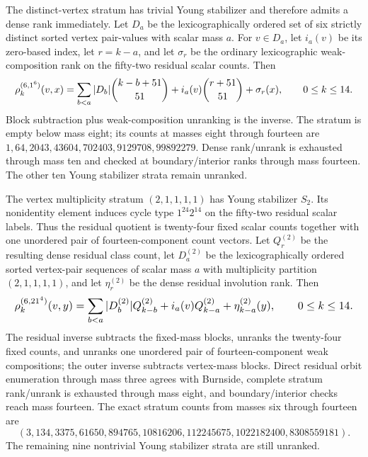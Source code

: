 \documentclass{article}
\newcommand{\fitmath}[1]{\resizebox{0.99\linewidth}{!}{$\displaystyle #1$}}
\begin{document}
The distinct-vertex stratum has trivial Young stabilizer and therefore admits a
dense rank immediately. Let $D_a$ be the lexicographically ordered set of six
strictly distinct sorted vertex pair-values with scalar mass $a$. For
$v\in D_a$, let $i_a(v)$ be its zero-based index, let $r=k-a$, and let
$\sigma_r$ be the ordinary lexicographic weak-composition rank on the fifty-two
residual scalar counts. Then
\begin{equation}
  \fitmath{%
    \rho^{(6,1^6)}_k(v,x)
      =\sum_{b<a}|D_b|\binom{k-b+51}{51}
       +i_a(v)\binom{r+51}{51}+\sigma_r(x),
    \qquad 0\leq k\leq14.
  }
  \label{eq:optimization-crazy-sextuple-s6-distinct-vertex-ranking}
\end{equation}
Block subtraction plus weak-composition unranking is the inverse. The stratum is
empty below mass eight; its counts at masses eight through fourteen are
$1,64,2043,43604,702403,9129708,99892279$. Dense rank/unrank is exhausted
through mass ten and checked at boundary/interior ranks through mass fourteen.
The other ten Young stabilizer strata remain unranked.

The vertex multiplicity stratum $(2,1,1,1,1)$ has Young stabilizer $S_2$.
Its nonidentity element induces cycle type $1^{24}2^{14}$ on the fifty-two
residual scalar labels. Thus the residual quotient is twenty-four fixed scalar
counts together with one unordered pair of fourteen-component count vectors.
Let $Q_r^{(2)}$ be the resulting dense residual class count, let $D_a^{(2)}$ be
the lexicographically ordered sorted vertex-pair sequences of scalar mass $a$
with multiplicity partition $(2,1,1,1,1)$, and let $\eta_r^{(2)}$ be the dense
residual involution rank. Then
\begin{equation}
  \fitmath{%
    \rho^{(6,2 1^4)}_k(v,y)
      =\sum_{b<a}|D_b^{(2)}|Q_{k-b}^{(2)}
       +i_a(v)Q_{k-a}^{(2)}+\eta_{k-a}^{(2)}(y),
    \qquad 0\leq k\leq14.
  }
  \label{eq:optimization-crazy-sextuple-s6-s2-vertex-ranking}
\end{equation}
The residual inverse subtracts the fixed-mass blocks, unranks the twenty-four
fixed counts, and unranks one unordered pair of fourteen-component weak
compositions; the outer inverse subtracts vertex-mass blocks. Direct residual
orbit enumeration through mass three agrees with Burnside, complete stratum
rank/unrank is exhausted through mass eight, and boundary/interior checks reach
mass fourteen. The exact stratum counts from masses six through fourteen are
\[
  (3,134,3375,61650,894765,10816206,112245675,1022182400,8308559181).
\]
The remaining nine nontrivial Young stabilizer strata are still unranked.
\end{document}
